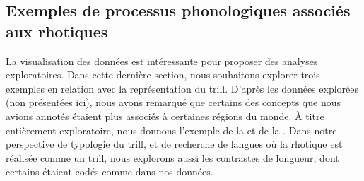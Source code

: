 









\subsection{Exemples de processus phonologiques associés aux rhotiques}

La visualisation des données est intéressante pour proposer des analyses exploratoires. Dans cette dernière section, nous souhaitons explorer trois exemples en relation avec la représentation du trill. D'après les données explorées (non présentées ici), nous avons remarqué que certains des concepts que nous avions annotés étaient plus associés à certaines régions du monde. À titre entièrement exploratoire, nous donnons l'exemple de la  et de la . Dans notre perspective de typologie du trill, et de recherche de langues où la rhotique est réalisée comme un trill, nous explorons aussi les contrastes de longueur, dont certains étaient codés comme  dans nos données.\\

